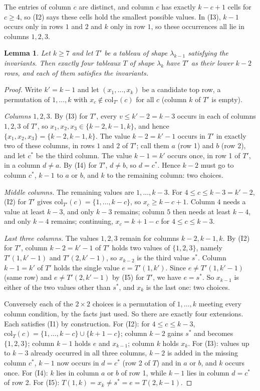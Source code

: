 \documentclass[11pt]{amsart}
\newtheorem{lemma}[theorem]{Lemma}
\theoremstyle{definition}
\theoremstyle{remark}
\begin{document}
The entries of column $c$ are distinct, and column $c$ has exactly $k-c+1$ cells for $c\ge4$, so (I2) says these cells hold the smallest possible values. In (I3), $k-1$ occurs only in rows $1$ and $2$ and $k$ only in row $1$, so these occurrences all lie in columns $1,2,3$.

\begin{lemma}\label{lem:step}
Let $k\ge7$ and let $T'$ be a tableau of shape $\lambda_{k-1}$ satisfying the invariants. Then exactly four tableaux $T$ of shape $\lambda_k$ have $T'$ as their lower $k-2$ rows, and each of them satisfies the invariants.
\end{lemma}

\begin{proof}
Write $k'=k-1$ and let $(x_1,\dots,x_k)$ be a candidate top row, a permutation of $1,\dots,k$ with $x_c\notin\mathrm{col}_{T'}(c)$ for all $c$ (column $k$ of $T'$ is empty).

\emph{Columns $1,2,3$.} By (I3) for $T'$, every $v\le k'-2=k-3$ occurs in each of columns $1,2,3$ of $T'$, so $x_1,x_2,x_3\in\{k-2,k-1,k\}$, and hence $\{x_1,x_2,x_3\}=\{k-2,k-1,k\}$. The value $k-2=k'-1$ occurs in $T'$ in exactly two of these columns, in rows $1$ and $2$ of $T'$; call them $a$ (row 1) and $b$ (row 2), and let $c^*$ be the third column. The value $k-1=k'$ occurs once, in row 1 of $T'$, in a column $d\ne a$. By (I4) for $T'$, $d\ne b$, so $d=c^*$. Hence $k-2$ must go to column $c^*$, $k-1$ to $a$ or $b$, and $k$ to the remaining column: two choices.

\emph{Middle columns.} The remaining values are $1,\dots,k-3$. For $4\le c\le k-3=k'-2$, (I2) for $T'$ gives $\mathrm{col}_{T'}(c)=\{1,\dots,k-c\}$, so $x_c\ge k-c+1$. Column $4$ needs a value at least $k-3$, and only $k-3$ remains; column $5$ then needs at least $k-4$, and only $k-4$ remains; continuing, $x_c=k+1-c$ for $4\le c\le k-3$.

\emph{Last three columns.} The values $1,2,3$ remain for columns $k-2,k-1,k$. By (I2) for $T'$, column $k-2=k'-1$ of $T'$ holds two values of $\{1,2,3\}$, namely $T'(1,k'-1)$ and $T'(2,k'-1)$, so $x_{k-2}$ is the third value $s^*$. Column $k-1=k'$ of $T'$ holds the single value $e=T'(1,k')$. Since $e\ne T'(1,k'-1)$ (same row) and $e\ne T'(2,k'-1)$ by (I5) for $T'$, we have $e=s^*$. So $x_{k-1}$ is either of the two values other than $s^*$, and $x_k$ is the last one: two choices.

Conversely each of the $2\times2$ choices is a permutation of $1,\dots,k$ meeting every column condition, by the facts just used. So there are exactly four extensions. Each satisfies (I1) by construction. For (I2): for $4\le c\le k-3$, $\mathrm{col}_T(c)=\{1,\dots,k-c\}\cup\{k+1-c\}$; column $k-2$ gains $s^*$ and becomes $\{1,2,3\}$; column $k-1$ holds $e$ and $x_{k-1}$; column $k$ holds $x_k$. For (I3): values up to $k-3$ already occurred in all three columns, $k-2$ is added in the missing column $c^*$, $k-1$ now occurs in $d=c^*$ (row 2 of $T$) and in $a$ or $b$, and $k$ occurs once. For (I4): $k$ lies in column $a$ or $b$ of row 1, while $k-1$ lies in column $d=c^*$ of row 2. For (I5): $T(1,k)=x_k\ne s^*=e=T(2,k-1)$.
\end{proof}
\end{document}
